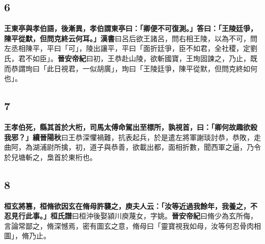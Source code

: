 \subsection*{6}

\textbf{王東亭與孝伯語，後漸異，孝伯謂東亭曰：「卿便不可復測。」答曰：「王陵廷爭，陳平從默，但問克終云何耳。」}{\footnotesize \textbf{漢書}曰呂后欲王諸呂，問右相王陵，以為不可，問左丞相陳平，平曰「可」，陵出讓平，平曰「面折廷爭，臣不如君，全社稷，定劉氏，君不如臣」。\textbf{晉安帝紀}曰初，王恭赴山陵，欲斬國寶，王珣固諫之，乃止，既而恭謂珣曰「此日視君，一似胡廣」，珣曰「王陵廷爭，陳平從默，但問克終如何也」。}

\subsection*{7}

\textbf{王孝伯死，縣其首於大桁，司馬太傅命駕出至標所，孰視首，曰：「卿何故趣欲殺我邪？」}{\footnotesize \textbf{續晉陽秋}曰王恭深懼禍難，抗表起兵，於是遣左將軍謝琰討恭，恭敗，走曲阿，為湖浦尉所擒，初，道子與恭善，欲載出都，面相折數，聞西軍之逼，乃令於兒塘斬之，梟首於東桁也。}

\subsection*{8}

\textbf{桓玄將篡，桓脩欲因玄在脩母許襲之，庾夫人云：「汝等近過我餘年，我養之，不忍見行此事。」}{\footnotesize \textbf{桓氏譜}曰桓沖後娶潁川庾蔑女，字姚。\textbf{晉安帝紀}曰脩少為玄所侮，言論常鄙之，脩深憾焉，密有圖玄之意，脩母曰「靈寶視我如母，汝等何忍骨肉相圖」，脩乃止。}